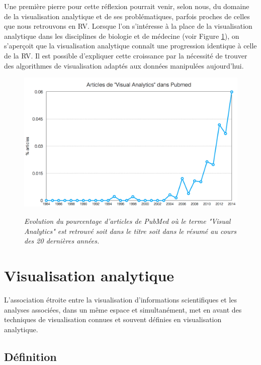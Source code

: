 
Une première pierre pour cette réflexion pourrait venir, selon nous, du domaine de la visualisation analytique et de ses problématiques, parfois proches de celles que nous retrouvons en RV.
Lorsque l'on s'intéresse à la place de la visualisation analytique dans les disciplines de biologie et de médecine (voir Figure \ref{Fig:VA_pubmed_trend}), on s'aperçoit que la visualisation analytique connaît une progression identique à celle de la RV. Il est possible d'expliquer cette croissance par la nécessité de trouver des algorithmes de visualisation adaptés aux données manipulées aujourd'hui.

\begin{figure}
  \centering
  {\includegraphics[width=.75\linewidth]{./figures/ch4/VA_pubmed_trend.png}}
    \caption{{\it Evolution du pourcentage d'articles de PubMed où le terme "Visual Analytics" est retrouvé soit dans le titre soit dans le résumé au cours des 20 dernières années.}}
  \label{Fig:VA_pubmed_trend}
  \hspace{0.3cm}
\end{figure}


\section{Visualisation analytique}

L'association étroite entre la visualisation d'informations scientifiques et les analyses associées, dans un même espace et simultanément, met en avant des techniques de visualisation connues et souvent définies en visualisation analytique.

\subsection{Définition}

